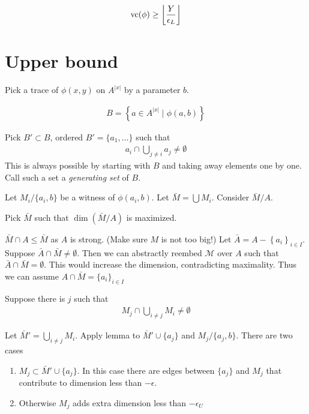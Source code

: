 \documentclass{amsart}
\newcommand{\M}{\mathcal M}
\newcommand{\curly}[1]{\left\{#1\right\}}
\providecommand{\floor}[1]{\left \lfloor #1 \right \rfloor }
\begin{document}
\begin{align*}
	\vc(\phi) \geq \floor{\frac{Y}{\epsilon_L}}
\end{align*}

\section*{Upper bound}

Pick a trace of $\phi(x,y)$ on $A^{|x|}$ by a parameter $b$.

\begin{align*}
	B = \curly{a \in A^{|x|} \mid \phi(a, b)}
\end{align*}

Pick $B' \subset B$, ordered $B' = \{a_1, \ldots\}$ such that
\begin{align*}
	a_i \cap \bigcup_{j \neq i} a_j \neq \emptyset
\end{align*}
This is always possible by starting with $B$ and taking away elements one by one.
Call such a set a \emph{generating set} of $B$.

Let $M_i / \{a_i, b\}$ be a witness of $\phi(a_i, b)$.
Let $\bar M = \bigcup M_i$.
Consider $\bar M / A$.

Pick $\bar M$ such that $\dim(\bar M / A)$ is maximized.

$\bar M \cap A \leq \bar M$ as $A$ is strong. (Make sure $M$ is not too big!)
Let $\bar A = A - \curly{a_i}_{i \in I}$.
Suppose $\bar A \cap \bar M \neq \emptyset$.
Then we can abstractly reembed $\M$ over $A$ such that $\bar A \cap \bar M = \emptyset$.
This would increase the dimension, contradicting maximality.
Thus we can assume $A \cap \bar M = \{a_i\}_{i \in I}$

Suppose there is $j$ such that
\begin{align*}
	M_j \cap \bigcup_{i \neq j} M_i \neq \emptyset
\end{align*}

Let $\bar M' = \bigcup_{i \neq j} M_i$.
Apply lemma to $\bar M' \cup \{a_j\}$ and $M_j / \{a_j, b\}$.
There are two cases
\begin{enumerate}
	\item $M_j \subset \bar M' \cup \{a_j\}$.
	In this case there are edges between $\{a_j\}$ and $M_j$ that contribute to dimension less than $-\epsilon$.
	\item Otherwise $M_j$ adds extra dimension less than $-\epsilon_U$
\end{enumerate}
\end{document}
